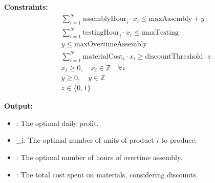\documentclass{article}
\begin{document}
\textbf{Constraints:}
\begin{align}
    &\sum_{i=1}^{N} \text{assemblyHour}_i \cdot x_i \leq \text{maxAssembly} + y \\
    &\sum_{i=1}^{N} \text{testingHour}_i \cdot x_i \leq \text{maxTesting} \\
    &y \leq \text{maxOvertimeAssembly} \\
    &\sum_{i=1}^{N} \text{materialCost}_i \cdot x_i \geq \text{discountThreshold} \cdot z \\
    &x_i \geq 0, \quad x_i \in \mathbb{Z} \quad \forall i \\
    &y \geq 0, \quad y \in \mathbb{Z} \\
    &z \in \{0, 1\}
\end{align}

\textbf{Output:}
\begin{itemize}
    \item {}: The optimal daily profit.
    \item {}_i: The optimal number of units of product \( i \) to produce.
    \item {}: The optimal number of hours of overtime assembly.
    \item {}: The total cost spent on materials, considering discounts.
\end{itemize}
\end{document}
